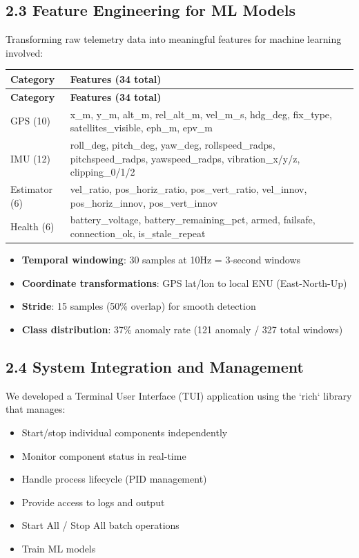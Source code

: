 \documentclass[12pt,a4paper]{article}
\begin{document}
\subsection{2.3 Feature Engineering for ML Models}

Transforming raw telemetry data into meaningful features for machine learning involved:

\begin{longtable}{|p{3.5cm}|p{11cm}|}
\hline
\textbf{Category} & \textbf{Features (34 total)} \\
\hline
\endfirsthead
\hline
\textbf{Category} & \textbf{Features (34 total)} \\
\hline
\endhead
\hline
GPS (10) & x\_m, y\_m, alt\_m, rel\_alt\_m, vel\_m\_s, hdg\_deg, fix\_type, satellites\_visible, eph\_m, epv\_m \\
\hline
IMU (12) & roll\_deg, pitch\_deg, yaw\_deg, rollspeed\_radps, pitchspeed\_radps, yawspeed\_radps, vibration\_x/y/z, clipping\_0/1/2 \\
\hline
Estimator (6) & vel\_ratio, pos\_horiz\_ratio, pos\_vert\_ratio, vel\_innov, pos\_horiz\_innov, pos\_vert\_innov \\
\hline
Health (6) & battery\_voltage, battery\_remaining\_pct, armed, failsafe, connection\_ok, is\_stale\_repeat \\
\hline
\end{longtable}

\begin{itemize}
    \item \textbf{Temporal windowing}: 30 samples at 10Hz = 3-second windows
    \item \textbf{Coordinate transformations}: GPS lat/lon to local ENU (East-North-Up)
    \item \textbf{Stride}: 15 samples (50\% overlap) for smooth detection
    \item \textbf{Class distribution}: 37\% anomaly rate (121 anomaly / 327 total windows)
\end{itemize}

\subsection{2.4 System Integration and Management}

We developed a Terminal User Interface (TUI) application using the `rich` library that manages:

\begin{itemize}
    \item Start/stop individual components independently
    \item Monitor component status in real-time
    \item Handle process lifecycle (PID management)
    \item Provide access to logs and output
    \item Start All / Stop All batch operations
    \item Train ML models
\end{itemize}
\end{document}
